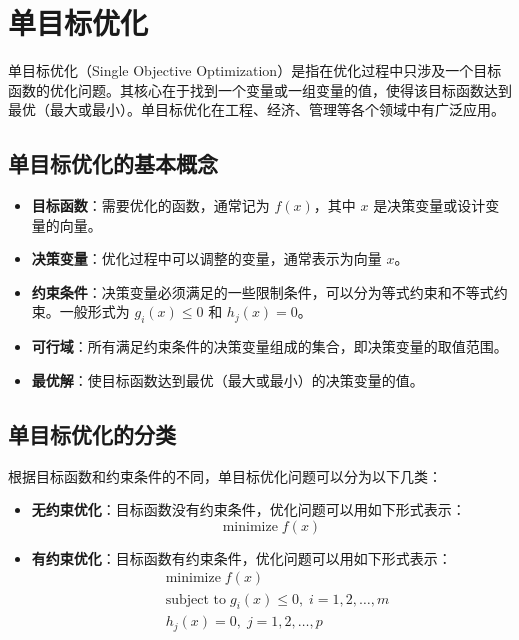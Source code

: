 \documentclass{article}
\begin{document}
\section*{单目标优化}

单目标优化（Single Objective Optimization）是指在优化过程中只涉及一个目标函数的优化问题。其核心在于找到一个变量或一组变量的值，使得该目标函数达到最优（最大或最小）。单目标优化在工程、经济、管理等各个领域中有广泛应用。

\subsection*{单目标优化的基本概念}

\begin{itemize}
    \item \textbf{目标函数}：需要优化的函数，通常记为 $ f(x) $，其中 $ x $ 是决策变量或设计变量的向量。
    \item \textbf{决策变量}：优化过程中可以调整的变量，通常表示为向量 $ x $。
    \item \textbf{约束条件}：决策变量必须满足的一些限制条件，可以分为等式约束和不等式约束。一般形式为 $ g_i(x) \leq 0 $ 和 $ h_j(x) = 0 $。
    \item \textbf{可行域}：所有满足约束条件的决策变量组成的集合，即决策变量的取值范围。
    \item \textbf{最优解}：使目标函数达到最优（最大或最小）的决策变量的值。
\end{itemize}

\subsection*{单目标优化的分类}

根据目标函数和约束条件的不同，单目标优化问题可以分为以下几类：

\begin{itemize}
    \item \textbf{无约束优化}：目标函数没有约束条件，优化问题可以用如下形式表示：
    \[
    \text{minimize} \; f(x)
    \]
    \item \textbf{有约束优化}：目标函数有约束条件，优化问题可以用如下形式表示：
    \[
    \begin{aligned}
    & \text{minimize} \; f(x) \\
    & \text{subject to} \; g_i(x) \leq 0, \; i = 1, 2, \ldots, m \\
    & h_j(x) = 0, \; j = 1, 2, \ldots, p
    \end{aligned}
    \]
\end{itemize}
\end{document}
